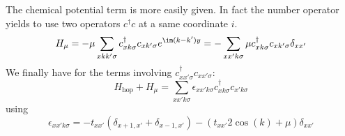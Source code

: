 \documentclass[../main.tex]{subfile}
\begin{document}
The chemical potential term is more easily given. In fact the number operator yields to use two operators $c^{\dagger}c$ at a same coordinate $i$.
\begin{equation}
    H_{\mu} = -\mu \sum_{x kk' \sigma} c_{x k\sigma}^{\dagger} c_{x k'\sigma} e^{\im (k-k')y} = -   \sum_{xx'k\sigma} \mu c_{xk\sigma}^{\dagger} c_{xk'\sigma} \delta_{xx'}     
\end{equation}
We finally have for the terms involving $c^{\dagger}_{xx'\sigma} c_{xx'\sigma}$:
\begin{equation*}
    H_{\text{hop}} + H_{\mu} = \sum_{xx'k\sigma} \epsilon_{xx'k\sigma} c_{xk\sigma}^{\dagger} c_{x'k\sigma}
\end{equation*}
using
\[
    \epsilon_{xx'k\sigma}= - t_{xx'} \left(\delta_{x+1, x'} + \delta_{x-1,x'}\right) - \left(t_{xx'}2\cos(k) + \mu\right) \delta_{xx'}
\]
\end{document}
